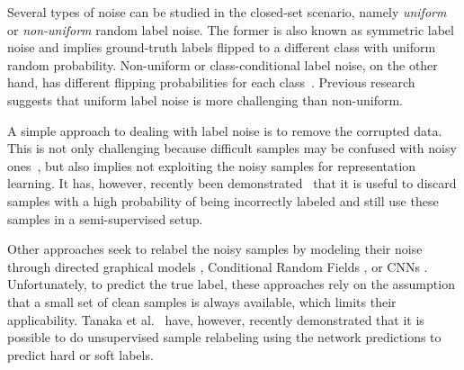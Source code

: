 \documentclass{article}
\begin{document}
Several types of noise can be studied in the closed-set scenario,
namely \emph{uniform} or \emph{non-uniform} random label noise. The
former is also known as symmetric label noise and implies ground-truth
labels flipped to a different class with uniform random probability.
Non-uniform or class-conditional label noise, on the other hand, has
different flipping probabilities for each class~\cite{2018_NIPS_GoldLoss}.
Previous research~\cite{2017_CVPR_ForwardLoss} suggests that uniform
label noise is more challenging than non-uniform.

A simple approach to dealing with label noise is to remove the corrupted
data. This is not only challenging because difficult samples may be
confused with noisy ones~\cite{2018_CVPR_IterativeNoise}, but also
implies not exploiting the noisy samples for representation learning.
It has, however, recently been demonstrated~\cite{2018_WACV_SemiSupNoise}
that it is useful to discard samples with a high probability of being
incorrectly labeled and still use these samples in a semi-supervised
setup.

Other approaches seek to relabel the noisy samples by modeling their
noise through directed graphical models \cite{2015_CVPR_GraphModelNoise},
Conditional Random Fields \cite{2017_NIPS}, or CNNs \cite{2017_CVPR_CRFrelabel}.
Unfortunately, to predict the true label, these approaches rely on the
assumption that a small set of clean samples is always available,
which limits their applicability. Tanaka et al.~\cite{2018_CVPR_JointOpt}
have, however, recently demonstrated that it is possible to do unsupervised sample relabeling using the network predictions to
predict hard or soft labels.
\end{document}
